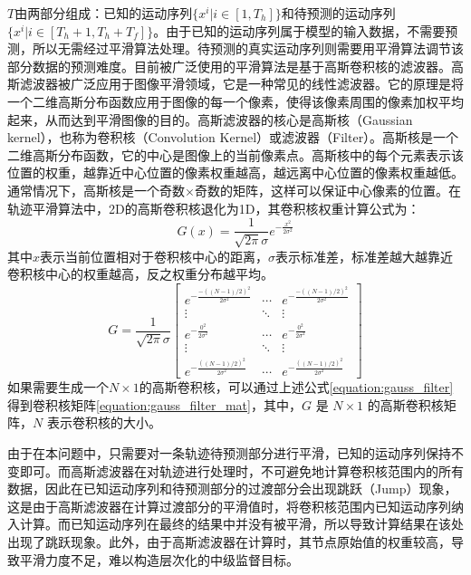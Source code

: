 $T$由两部分组成：已知的运动序列$\{x^i|i\in[1,T_h]\}$和待预测的运动序列$\{x^i|i\in[T_h+1,T_h+T_f]\}$。由于已知的运动序列属于模型的输入数据，不需要预测，所以无需经过平滑算法处理。待预测的真实运动序列则需要用平滑算法调节该部分数据的预测难度。目前被广泛使用的平滑算法是基于高斯卷积核的滤波器。高斯滤波器被广泛应用于图像平滑领域，它是一种常见的线性滤波器。它的原理是将一个二维高斯分布函数应用于图像的每一个像素，使得该像素周围的像素加权平均起来，从而达到平滑图像的目的。高斯滤波器的核心是高斯核（Gaussian kernel），也称为卷积核（Convolution Kernel）或滤波器（Filter）。高斯核是一个二维高斯分布函数，它的中心是图像上的当前像素点。高斯核中的每个元素表示该位置的权重，越靠近中心位置的像素权重越高，越远离中心位置的像素权重越低。通常情况下，高斯核是一个奇数×奇数的矩阵，这样可以保证中心像素的位置。在轨迹平滑算法中，2D的高斯卷积核退化为1D，其卷积核权重计算公式为：
\begin{equation}
    G(x) = \frac{1}{\sqrt{2\pi}\sigma}e^{-\frac{x^2}{2\sigma^2}}
    \label{equation:gauss_filter}
\end{equation}
其中$x$表示当前位置相对于卷积核中心的距离，$\sigma$表示标准差，标准差越大越靠近卷积核中心的权重越高，反之权重分布越平均。
\begin{equation}
    G = \frac{1}{\sqrt{2\pi}\sigma}
        \begin{bmatrix}e^{-\frac{-{((N-1)/2)} ^2}{2\sigma^2}} & \cdots & e^{-\frac{-{((N-1)/2)}^2}{2\sigma^2}} \\ 
        \vdots & \ddots & \vdots \\
        e^{-\frac{0^2}{2\sigma^2}} & \cdots & e^{-\frac{0^2}{2\sigma^2}} \\
        \vdots & \ddots & \vdots \\
        e^{-\frac{{((N-1)/2)}^2}{2\sigma^2}} & \cdots & e^{-\frac{{((N-1)/2)}^2}{2\sigma^2}
        }\end{bmatrix}
    \label{equation:gauss_filter_mat}
\end{equation}
如果需要生成一个$N\times 1$的高斯卷积核，可以通过上述公式\ref{equation:gauss_filter}得到卷积核矩阵\ref{equation:gauss_filter_mat}，其中，$G$ 是 $N\times 1$ 的高斯卷积核矩阵，$N$ 表示卷积核的大小。

由于在本问题中，只需要对一条轨迹待预测部分进行平滑，已知的运动序列保持不变即可。而高斯滤波器在对轨迹进行处理时，不可避免地计算卷积核范围内的所有数据，因此在已知运动序列和待预测部分的过渡部分会出现跳跃（Jump）现象，这是由于高斯滤波器在计算过渡部分的平滑值时，将卷积核范围内已知运动序列纳入计算。而已知运动序列在最终的结果中并没有被平滑，所以导致计算结果在该处出现了跳跃现象。此外，由于高斯滤波器在计算时，其节点原始值的权重较高，导致平滑力度不足，难以构造层次化的中级监督目标。

